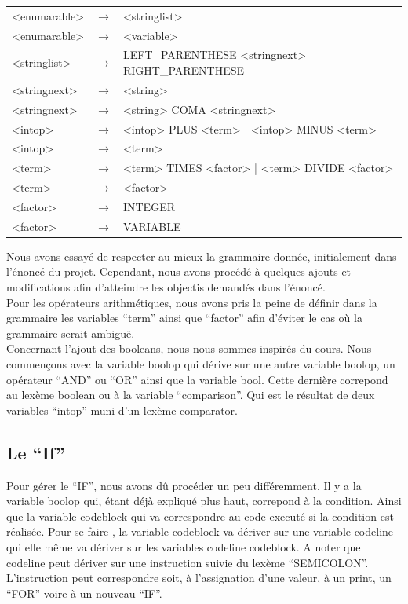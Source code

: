 \documentclass[10pt,a4paper]{article}
\begin{document}
\begin{tabular}{|l l l|}
		<enumarable> & $\longrightarrow$ & <stringlist>\\
		<enumarable> & $\longrightarrow$ & <variable>\\
		<stringlist> & $\longrightarrow$ & LEFT_PARENTHESE <stringnext> RIGHT_PARENTHESE\\
		<stringnext> & $\longrightarrow$ & <string>\\
		<stringnext> & $\longrightarrow$ & <string> COMA <stringnext>\\
		<intop> & $\longrightarrow$ & <intop> PLUS <term> | <intop> MINUS <term>\\
		<intop> & $\longrightarrow$ & <term>\\
		<term> & $\longrightarrow$ & <term> TIMES <factor> | <term> DIVIDE <factor> \\
		<term> & $\longrightarrow$ & <factor>\\
		<factor> & $\longrightarrow$ & INTEGER\\
		<factor> & $\longrightarrow$ & VARIABLE\\
		\hline
	\end{tabular}
	
	Nous avons essayé de respecter au mieux la grammaire donnée, initialement dans l'énoncé du projet.
	Cependant, nous avons procédé à quelques ajouts et modifications afin d'atteindre les objectis demandés dans 
	l'énoncé.\\
	Pour les opérateurs arithmétiques, nous avons pris la peine de définir dans la grammaire les variables ``term'' ainsi que ``factor'' afin d'éviter
	le cas où la grammaire serait ambiguë.\\
	Concernant l'ajout des booleans, nous nous sommes inspirés du cours. Nous commençons avec la variable boolop qui dérive sur une autre variable
	boolop, un opérateur ``AND'' ou ``OR'' ainsi que la variable bool. Cette dernière correpond au lexème boolean ou à la variable ``comparison''.
	Qui est le résultat de deux variables ``intop'' muni d'un lexème comparator.
	\subsection{Le ``If''}
	Pour gérer le ``IF'', nous avons dû procéder un peu différemment. Il y a la variable boolop qui, étant déjà expliqué plus haut, correpond à la condition.
	Ainsi que la variable codeblock qui va correspondre au code executé si la condition est réalisée. Pour se faire , la variable codeblock va dériver
	sur une variable codeline qui elle même va dériver sur les variables codeline codeblock. A noter que codeline peut dériver sur une instruction
	suivie du lexème ``SEMICOLON''. L'instruction peut correspondre soit, à l'assignation d'une valeur, à un print, un ``FOR'' voire à un nouveau ``IF''.
	\\
\end{document}
